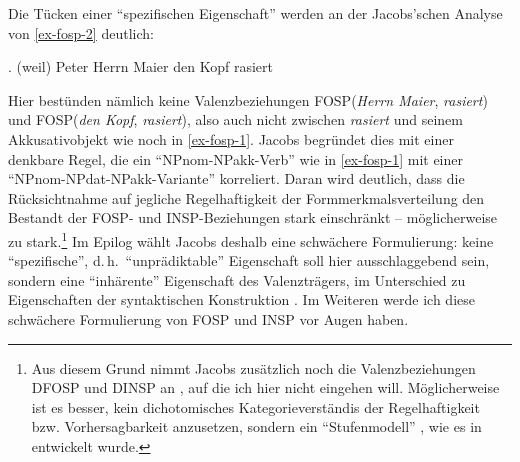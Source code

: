 Die Tücken einer "`spezifischen Eigenschaft"' werden an der Jacobs'schen Analyse von \ref{ex-fosp-2} deutlich:

\ex. \label{ex-fosp-2}(weil) Peter Herrn Maier den Kopf rasiert

Hier bestünden nämlich keine Valenzbeziehungen FOSP({\it Herrn Maier}, {\it rasiert}) und FOSP({\it den Kopf}, {\it rasiert}), also auch nicht zwischen {\it rasiert} und seinem Akku\-sativ\-objekt wie noch in \ref{ex-fosp-1}. Jacobs begründet dies mit einer denkbare Regel, die ein "`NPnom-NPakk-Verb"' wie in \ref{ex-fosp-1} mit einer "`NPnom-NPdat-NPakk-Variante"' korreliert. Daran wird deutlich, dass die Rücksichtnahme auf jegliche Regelhaftigkeit der Formmerkmalsverteilung den Bestandt der FOSP- und INSP-Beziehun\-gen stark einschränkt -- möglicherweise zu stark.\footnote{Aus diesem Grund nimmt Jacobs zusätzlich noch die Valenzbeziehungen DFOSP und DINSP an \citep[25]{Jacobs:94}, auf die ich hier nicht eingehen will. Möglicherweise ist es besser, kein dichotomisches Kategorieverständis der Regelhaftigkeit bzw. Vorhersagbarkeit anzusetzen, sondern ein "`Stufenmodell"' \cite[181]{Agel:00}, wie es in \cite{Breindl:89} entwickelt wurde.} Im Epilog wählt Jacobs deshalb eine schwächere Formulierung: keine "`spezifische"', d.\,h.\ "`unprädiktable"' Eigenschaft soll hier ausschlaggebend sein, sondern eine "`inhärente"' Eigenschaft des Valenzträgers, im Unterschied zu Eigenschaften der syntaktischen Konstruktion \cite[71f]{Jacobs:94}. Im Weiteren werde ich diese schwächere Formulierung von FOSP und INSP vor Augen haben.


